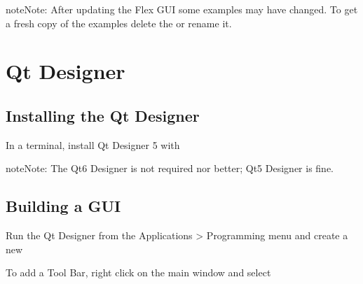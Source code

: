 \documentclass[letterpaper,10pt,english]{sphinxmanual}
\begin{document}
\begin{sphinxadmonition}{note}{Note:}
\sphinxAtStartPar
After updating the Flex GUI some examples may have changed. To get a
fresh copy of the examples delete the  or
rename it.
\end{sphinxadmonition}

\sphinxstepscope


\chapter{Qt Designer}
\label{\detokenize{designer:qt-designer}}\label{\detokenize{designer::doc}}

\section{Installing the Qt Designer}
\label{\detokenize{designer:installing-the-qt-designer}}\label{\detokenize{designer:install-designer}}
\sphinxAtStartPar
In a terminal, install Qt Designer 5 with

\begin{sphinxVerbatim}[commandchars=\\\{\}]
   
\end{sphinxVerbatim}

\begin{sphinxadmonition}{note}{Note:}
\sphinxAtStartPar
The Qt6 Designer is not required nor better; Qt5 Designer is fine.
\end{sphinxadmonition}


\section{Building a GUI}
\label{\detokenize{designer:building-a-gui}}\label{\detokenize{designer:build-gui}}
\sphinxAtStartPar
Run the Qt Designer from the Applications \textgreater{} Programming menu and create a new


\sphinxAtStartPar
To add a Tool Bar, right click on the main window and select 

\end{document}
